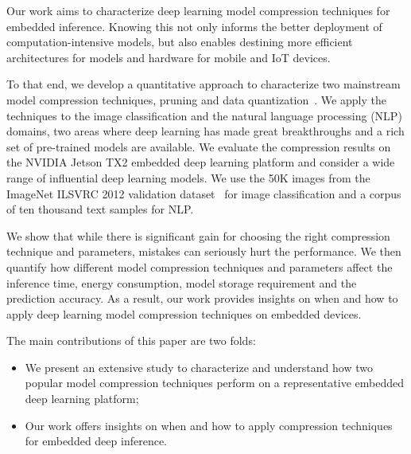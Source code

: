 Our work aims to characterize deep learning model compression techniques for embedded inference. Knowing this not only informs the better
deployment of computation-intensive models, but also enables destining more efficient architectures for models and hardware for mobile and
IoT devices.

To that end, we develop a quantitative approach  to characterize two mainstream model compression techniques,
pruning and data quantization~\cite{Gong2014Compressing}. We apply the techniques to the image
classification and the natural language processing (NLP) domains, two areas where deep learning has made great breakthroughs and a rich set
of pre-trained models are available. We evaluate the compression results on the NVIDIA Jetson TX2 embedded deep learning platform and
consider a wide range of influential deep learning models. We use the 50K images from the ImageNet ILSVRC 2012 validation
dataset~\cite{imagenet2012} for image classification and a corpus of ten thousand text samples\FIXME{~\cite{}} for NLP.


We show that while there is significant gain for choosing the right compression technique and parameters, mistakes can seriously hurt the
performance. We then quantify how different model compression techniques and parameters affect the inference time, energy consumption,
model storage requirement and the prediction accuracy. As a result, our work provides insights on when and how to apply deep learning model
compression techniques on embedded devices.

The main contributions of this paper are two folds:

\begin{itemize}
\item We present an extensive study to characterize and understand how two popular model compression techniques perform on a
    representative embedded deep learning platform;
\item Our work offers insights on when and how to apply compression techniques for embedded deep inference.
\end{itemize}
